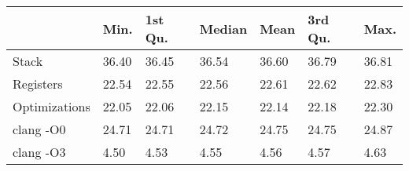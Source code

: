 \begin{table}[ht]
\centering
\begin{tabular}{p{}p{}p{}p{}p{}p{}p{}}
  \hline
 & Min. & 1st Qu. & Median & Mean & 3rd Qu. & Max. \\ 
  \hline
Stack & 36.40 & 36.45 & 36.54 & 36.60 & 36.79 & 36.81 \\ 
  Registers & 22.54 & 22.55 & 22.56 & 22.61 & 22.62 & 22.83 \\ 
  Optimizations & 22.05 & 22.06 & 22.15 & 22.14 & 22.18 & 22.30 \\ 
  clang -O0 & 24.71 & 24.71 & 24.72 & 24.75 & 24.75 & 24.87 \\ 
  clang -O3 & 4.50 & 4.53 & 4.55 & 4.56 & 4.57 & 4.63 \\ 
   \hline
\end{tabular}
\end{table}
